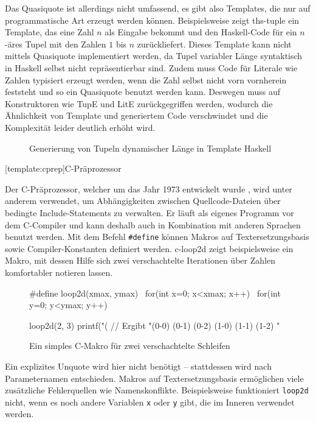 \documentclass[12pt, a4paper, bibgerm]{scrbook}
\newenvironment{DIFnomarkup}{}{}
\newcommand\icode[1]{\lstinline?#1?}
\newcommand\lsection{}
\newcommand\abb{}
\begin{document}
Das Quasiquote ist allerdings nicht umfassend, es gibt also Templates, die
nur auf programmatische Art erzeugt werden können. Beispielsweise zeigt
\abb{ths-tuple} ein Template, das eine Zahl $n$ als Eingabe bekommt und
den Haskell-Code für ein $n$-äres Tupel mit den Zahlen $1$ bis $n$
zurückliefert. Dieses Template kann nicht mittels Quasiquote implementiert
werden, da Tupel variabler Länge syntaktisch in Haskell selbst nicht
repräsentierbar sind. Zudem muss Code für Literale wie Zahlen typisiert
erzeugt werden, wenn die Zahl selbst nicht vorn vornherein feststeht und
so ein Quasiquote benutzt werden kann. Deswegen muss auf Konstruktoren wie
TupE und LitE zurückgegriffen werden, wodurch die Ähnlichkeit von
Template und generiertem Code verschwindet und die Komplexität leider
deutlich erhöht wird.

\begin{figure}[h]
  \centering
  \begin{DIFnomarkup}\end{DIFnomarkup} %
  \caption{Generierung von Tupeln dynamischer Länge in Template Haskell}
  \label{magicl:fig:ths-tuple}
\end{figure}

\lsection[template:cprep]{C-Präprozessor}

Der C-Präprozessor, welcher um das Jahr 1973 entwickelt
wurde \cite{CPrep}, wird unter anderem verwendet, um Abhängigkeiten
zwischen Quellcode-Dateien über bedingte Include-Statements zu
verwalten. Er läuft als eigenes Programm vor dem C-Compiler und kann
deshalb auch in Kombination mit anderen Sprachen benutzt werden. Mit
dem Befehl \icode{#define} können Makros auf Textersetzungsbasis sowie
Compiler-Konstanten definiert werden. \abb{c-loop2d} zeigt
beispielsweise ein Makro, mit dessen Hilfe sich zwei verschachtelte
Iterationen über Zahlen komfortabler notieren lassen.
\begin{figure}[h]
  \centering
  \begin{DIFnomarkup}\begin{code}
#define loop2d(xmax, ymax)   \
  for(int x=0; x<xmax; x++)  \
   for(int y=0; y<ymax; y++)

loop2d(2, 3) {
  printf("(%
}
// Ergibt "(0-0) (0-1) (0-2) (1-0) (1-1) (1-2) "
  \end{code}\end{DIFnomarkup}
\caption{Ein simples C-Makro für zwei verschachtelte Schleifen}
  \label{magicl:fig:c-loop2d}
\end{figure}
Ein explizites Unquote wird hier nicht benötigt -- stattdessen wird nach
Parameternamen entschieden. Makros auf Textersetzungsbasis ermöglichen
viele zusätzliche Fehlerquellen wie Namenskonflikte. Beispielsweise
funktioniert \icode{loop2d} nicht, wenn es noch andere Variablen
\icode{x} oder \icode{y} gibt, die im Inneren verwendet werden.
\end{document}
